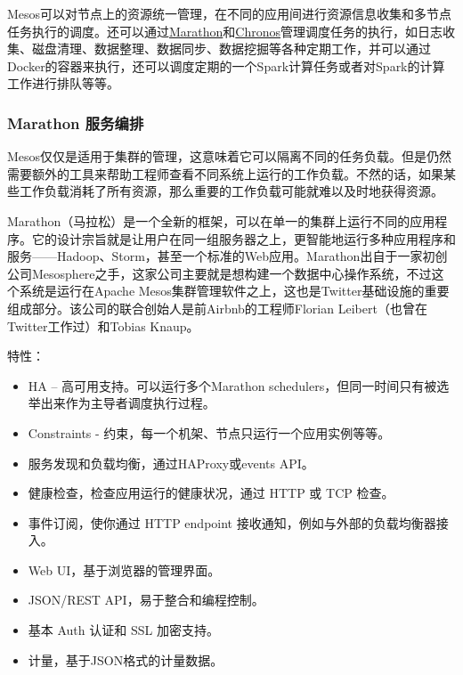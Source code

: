 \documentclass[letterpaper,10pt,english]{sphinxmanual}
\begin{document}
Mesos可以对节点上的资源统一管理，在不同的应用间进行资源信息收集和多节点任务执行的调度。还可以通过\href{https://mesosphere.github.io/marathon/}{Marathon}和\href{https://github.com/mesos/chronos}{Chronos}管理调度任务的执行，如日志收集、磁盘清理、数据整理、数据同步、数据挖掘等各种定期工作，并可以通过Docker的容器来执行，还可以调度定期的一个Spark计算任务或者对Spark的计算工作进行排队等等。


\subsubsection{Marathon 服务编排}
\label{gispark_cloud:Marathon-_u670d_u52a1_u7f16_u6392}
Mesos仅仅是适用于集群的管理，这意味着它可以隔离不同的任务负载。但是仍然需要额外的工具来帮助工程师查看不同系统上运行的工作负载。不然的话，如果某些工作负载消耗了所有资源，那么重要的工作负载可能就难以及时地获得资源。

Marathon（马拉松）是一个全新的框架，可以在单一的集群上运行不同的应用程序。它的设计宗旨就是让用户在同一组服务器之上，更智能地运行多种应用程序和服务——Hadoop、Storm，甚至一个标准的Web应用。Marathon出自于一家初创公司Mesosphere之手，这家公司主要就是想构建一个数据中心操作系统，不过这个系统是运行在Apache
Mesos集群管理软件之上，这也是Twitter基础设施的重要组成部分。该公司的联合创始人是前Airbnb的工程师Florian
Leibert（也曾在Twitter工作过）和Tobias Knaup。

特性：
\begin{itemize}
\item {} 
HA -- 高可用支持。可以运行多个Marathon
schedulers，但同一时间只有被选举出来作为主导者调度执行过程。

\item {} 
Constraints - 约束，每一个机架、节点只运行一个应用实例等等。

\item {} 
服务发现和负载均衡，通过HAProxy或events API。

\item {} 
健康检查，检查应用运行的健康状况，通过 HTTP 或 TCP 检查。

\item {} 
事件订阅，使你通过 HTTP endpoint
接收通知，例如与外部的负载均衡器接入。

\item {} 
Web UI，基于浏览器的管理界面。

\item {} 
JSON/REST API，易于整合和编程控制。

\item {} 
基本 Auth 认证和 SSL 加密支持。

\item {} 
计量，基于JSON格式的计量数据。

\end{itemize}
\end{document}
